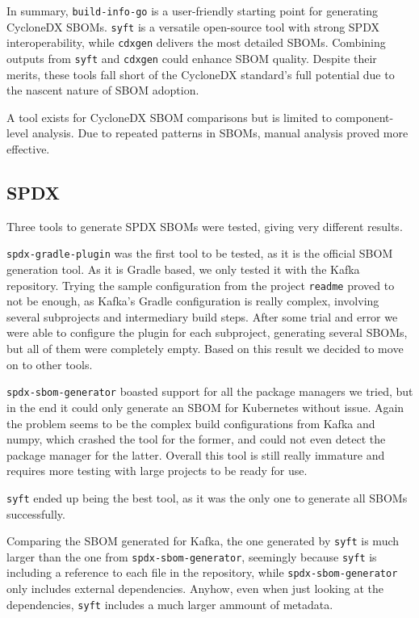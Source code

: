 In summary, \verb|build-info-go| is a user-friendly starting point for generating CycloneDX SBOMs. \verb|syft| is a versatile open-source tool with strong SPDX interoperability, while \verb|cdxgen| delivers the most detailed SBOMs. Combining outputs from \verb|syft| and \verb|cdxgen| could enhance SBOM quality. Despite their merits, these tools fall short of the CycloneDX standard's full potential due to the nascent nature of SBOM adoption.

A tool exists for CycloneDX SBOM comparisons but is limited to component-level analysis. Due to repeated patterns in SBOMs, manual analysis proved more effective.

\subsection{SPDX} \label{results:spdx}

Three tools to generate SPDX SBOMs were tested, giving very different results.

\verb|spdx-gradle-plugin| was the first tool to be tested, as it is the official SBOM generation tool. As it is Gradle based, we only tested it with the Kafka repository. Trying the sample configuration from the project \verb|readme| proved to not be enough, as Kafka's Gradle configuration is really complex, involving several subprojects and intermediary build steps. After some trial and error we were able to configure the plugin for each subproject, generating several SBOMs, but all of them were completely empty. Based on this result we decided to move on to other tools.

\verb|spdx-sbom-generator| boasted support for all the package managers we tried, but in the end it could only generate an SBOM for Kubernetes without issue. Again the problem seems to be the complex build configurations from Kafka and numpy, which crashed the tool for the former, and could not even detect the package manager for the latter. Overall this tool is still really immature and requires more testing with large projects to be ready for use.

\verb|syft| ended up being the best tool, as it was the only one to generate all SBOMs successfully.

Comparing the SBOM generated for Kafka, the one generated by \verb|syft| is much larger than the one from \verb|spdx-sbom-generator|, seemingly because \verb|syft| is including a reference to each file in the repository, while \verb|spdx-sbom-generator| only includes external dependencies. Anyhow, even when just looking at the dependencies, \verb|syft| includes a much larger ammount of metadata.

